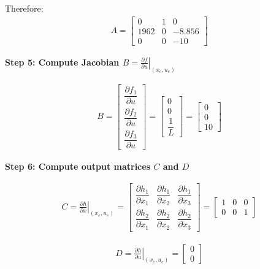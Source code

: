 \documentclass[11pt,a4paper]{article}
\begin{document}
Therefore:
\begin{align}
  A = \begin{bmatrix}
    0 & 1 & 0\\
    1962 & 0 & -8.856\\
    0 & 0 & -10
  \end{bmatrix}
\end{align}

\textbf{Step 5: Compute Jacobian $B = \left.\frac{\partial f}{\partial u}\right|_{(x_e,u_e)}$}

\begin{align}
  B = \begin{bmatrix}
    \dfrac{\partial f_1}{\partial u}\\[0.3em]
    \dfrac{\partial f_2}{\partial u}\\[0.3em]
    \dfrac{\partial f_3}{\partial u}
  \end{bmatrix} = \begin{bmatrix}
    0\\[0.2em]
    0\\[0.2em]
    \dfrac{1}{L}
  \end{bmatrix} = \begin{bmatrix}
    0\\
    0\\
    10
  \end{bmatrix}
\end{align}

\textbf{Step 6: Compute output matrices $C$ and $D$}

\begin{align}
  C = \left.\frac{\partial h}{\partial x}\right|_{(x_e,u_e)} = \begin{bmatrix}
    \dfrac{\partial h_1}{\partial x_1} & \dfrac{\partial h_1}{\partial x_2} & \dfrac{\partial h_1}{\partial x_3}\\[0.3em]
    \dfrac{\partial h_2}{\partial x_1} & \dfrac{\partial h_2}{\partial x_2} & \dfrac{\partial h_2}{\partial x_3}
  \end{bmatrix} = \begin{bmatrix}
    1 & 0 & 0\\
    0 & 0 & 1
  \end{bmatrix}
\end{align}

\begin{align}
  D = \left.\frac{\partial h}{\partial u}\right|_{(x_e,u_e)} = \begin{bmatrix}
    0\\
    0
  \end{bmatrix}
\end{align}
\end{document}
